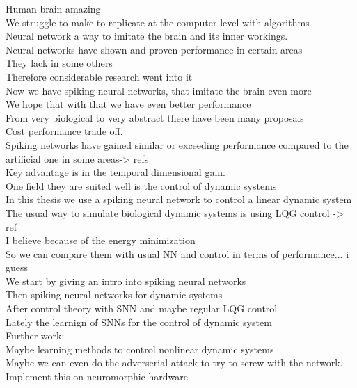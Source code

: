Human brain amazing\\
We struggle to make to replicate at the computer level with algorithms\\
Neural network a way to imitate the brain and its inner workings.\\
Neural networks have shown and proven performance in certain areas\\
They lack in some others\\
Therefore considerable research went into it\\
Now we have spiking neural networks, that imitate the brain even more\\
We hope that with that we have even better performance\\
From very biological to very abstract there have been many proposals\\
Cost performance trade off.\\
Spiking networks have gained similar or exceeding performance compared to the artificial one in some areas-> refs\\
Key advantage is in the temporal dimensional gain.\\
One field they are suited well is the control of dynamic systems\\
In this thesis we use a spiking neural network to control a linear dynamic system\\
The usual way to simulate biological dynamic systems is using LQG control -> ref\\
I believe because of the energy minimization\\
So we can compare them with usual NN and control in terms of performance... i guess\\
We start by giving an intro into spiking neural networks\\
Then spiking neural networks for dynamic systems\\
After control theory with SNN and maybe regular LQG control\\
Lately the learnign of SNNs for the control of dynamic system\\

Further work:\\
Maybe learning methods to control nonlinear dynamic systems\\
Maybe we can even do the adverserial attack to try to screw with the network.\\
Implement this on neuromorphic hardware\\

